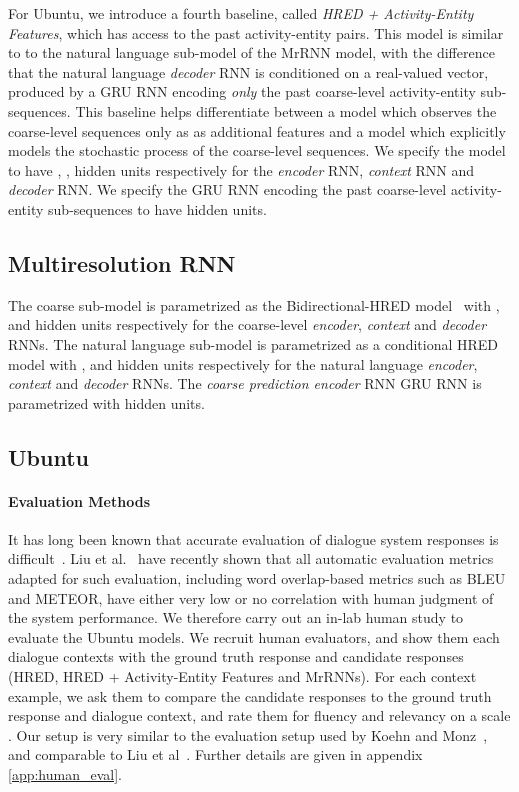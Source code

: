 \documentclass{article}
\begin{document}
For Ubuntu, we introduce a fourth baseline, called \textit{HRED + Activity-Entity Features}, which has access to the past activity-entity pairs.
This model is similar to to the natural language sub-model of the MrRNN model, with the difference that the natural language \textit{decoder} RNN is conditioned on a real-valued vector, produced by a GRU RNN encoding \textit{only} the past coarse-level activity-entity sub-sequences.
This baseline helps differentiate between a model which observes the coarse-level sequences only as as additional features and a model which explicitly models the stochastic process of the coarse-level sequences. 
We specify the model to have , ,  hidden units respectively for the \textit{encoder} RNN, \textit{context} RNN and \textit{decoder} RNN. We specify the GRU RNN encoding the past coarse-level activity-entity sub-sequences to have  hidden units.


\subsection{Multiresolution RNN}
The coarse sub-model is parametrized as the Bidirectional-HRED model~\cite{DBLP:conf/aaai/SerbanSBCP16} with ,  and  hidden units respectively for the coarse-level \textit{encoder}, \textit{context} and \textit{decoder} RNNs.
The natural language sub-model is parametrized as a conditional HRED model with ,  and  hidden units respectively for the natural language \textit{encoder}, \textit{context} and \textit{decoder} RNNs. 
The \textit{coarse prediction encoder} RNN GRU RNN is parametrized with  hidden units.


\subsection{Ubuntu}

\paragraph{Evaluation Methods}
It has long been known that accurate evaluation of dialogue system responses is difficult~\cite{schatzmann2005quantitative}.
Liu et al.~\cite{liu2016not} have recently shown that all automatic evaluation metrics adapted for such evaluation, including word overlap-based metrics such as BLEU and METEOR, have either very low or no correlation with human judgment of the system performance.
We therefore carry out an in-lab human study to evaluate the Ubuntu models.
We recruit  human evaluators, and show them each  dialogue contexts with the ground truth response and  candidate responses (HRED, HRED + Activity-Entity Features and MrRNNs).
For each context example, we ask them to compare the candidate responses to the ground truth response and dialogue context,
and rate them for fluency and relevancy on a scale .
Our setup is very similar to the evaluation setup used by Koehn and Monz~\cite{koehn2006manual}, and comparable to Liu et al~\cite{liu2016not}.
Further details are given in appendix \ref{app:human_eval}.
\end{document}
